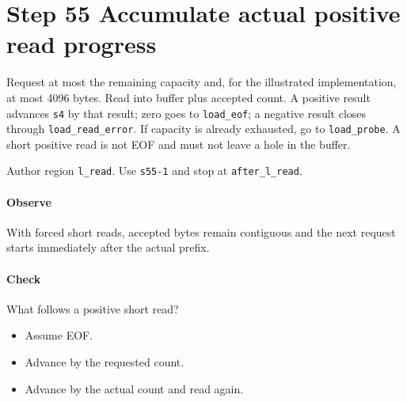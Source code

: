 \section{Step 55 Accumulate actual positive read progress}\label{pcm-wav-s55}
Request at most the remaining capacity and, for the illustrated implementation, at most 4096 bytes. Read into buffer plus accepted count. A positive result advances \texttt{s4} by that result; zero goes to \texttt{load\_eof}; a negative result closes through \texttt{load\_read\_error}. If capacity is already exhausted, go to \texttt{load\_probe}. A short positive read is not EOF and must not leave a hole in the buffer.

Author region \texttt{l\_read}. Use \texttt{s55-1} and stop at \texttt{after\_l\_read}.

\paragraph{Observe} With forced short reads, accepted bytes remain contiguous and the next request starts immediately after the actual prefix.

\paragraph{Check} What follows a positive short read?
\begin{itemize}
  \item[A.] Assume EOF.
  \item[B.] Advance by the requested count.
  \item[C.] Advance by the actual count and read again.
\end{itemize}
